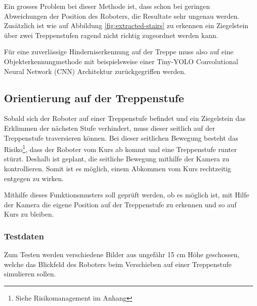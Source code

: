 Ein grosses Problem bei dieser Methode ist, dass schon bei geringen Abweichungen der Position
des Roboters, die Resultate sehr ungenau werden. 
Zusätzlich ist wie auf Abbildung \ref{fig:extracted-stairs} zu erkennen ein Ziegelstein über zwei Treppenstufen ragend nicht richtig zugeordnet werden kann.

Für eine zuverlässige Hinderniserkennung auf der Treppe muss also auf eine Objekterkennungmethode mit beispielsweise einer 
Tiny-YOLO \cite{YOLOv3} Convolutional Neural Network (CNN) Architektur zurückgegriffen werden.

\subsection{Orientierung auf der Treppenstufe}
\label{sec:orientierung-auf-treppenstufe-funktionsmuster}
Sobald sich der Roboter auf einer Treppenstufe befindet und ein Ziegelstein das Erklimmen der nächsten Stufe verhindert, muss dieser seitlich auf der Treppenstufe traversieren können. Bei dieser seitlichen Bewegung besteht das Risiko\footnote{Siehe Risikomanagement im Anhang}, dass der Roboter vom Kurs ab kommt und eine Treppenstufe runter stürzt.
Deshalb ist geplant, die seitliche Bewegung mithilfe der Kamera zu kontrollieren. Somit ist es möglich, einem Abkommen vom Kurs rechtzeitig entgegen zu wirken.

Mithilfe dieses Funktionsmusters soll geprüft werden, ob es möglich ist, mit Hilfe der Kamera die eigene Position auf der Treppenstufe zu erkennen und so auf Kurs zu bleiben. 

\subsubsection{Testdaten}
Zum Testen werden verschiedene Bilder aus ungefähr 15 cm Höhe geschossen, welche das Blickfeld des Roboters beim Verschieben auf einer Treppenstufe simulieren sollen.

